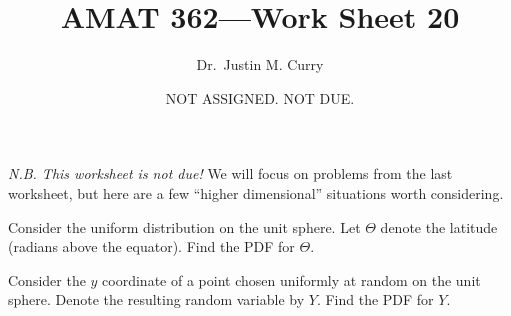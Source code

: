 \documentclass[addpoints,12pt]{exam}
\title{\vspace{-1in} AMAT 362---Work Sheet 20}
\date{NOT ASSIGNED. NOT DUE.}
\author{Dr.~Justin M. Curry}
\begin{document}
\maketitle




\emph{N.B. This worksheet is not due!} We will focus on problems from the last worksheet, but here are a few ``higher dimensional'' situations worth considering.

\begin{questions}


\question Consider the uniform distribution on the unit sphere. Let $\Theta$ denote the latitude (radians above the equator). Find the PDF for $\Theta$.

\vspace{3in}

\question Consider the $y$ coordinate of a point chosen uniformly at random on the unit sphere. Denote the resulting random variable by $Y$. Find the PDF for $Y$.
\end{questions}
\end{document}
